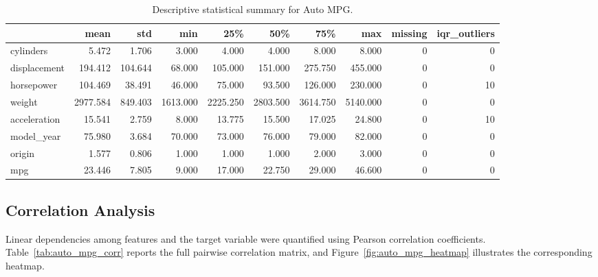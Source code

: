 \documentclass[11pt]{article}
\begin{document}
\begin{table}[H]
\centering
\small
\begin{tabular}{lrrrrrrrrr}
\toprule
 & mean & std & min & 25\% & 50\% & 75\% & max & missing & iqr\_outliers \\
\midrule
cylinders & 5.472 & 1.706 & 3.000 & 4.000 & 4.000 & 8.000 & 8.000 & 0 & 0 \\
displacement & 194.412 & 104.644 & 68.000 & 105.000 & 151.000 & 275.750 & 455.000 & 0 & 0 \\
horsepower & 104.469 & 38.491 & 46.000 & 75.000 & 93.500 & 126.000 & 230.000 & 0 & 10 \\
weight & 2977.584 & 849.403 & 1613.000 & 2225.250 & 2803.500 & 3614.750 & 5140.000 & 0 & 0 \\
acceleration & 15.541 & 2.759 & 8.000 & 13.775 & 15.500 & 17.025 & 24.800 & 0 & 10 \\
model\_year & 75.980 & 3.684 & 70.000 & 73.000 & 76.000 & 79.000 & 82.000 & 0 & 0 \\
origin & 1.577 & 0.806 & 1.000 & 1.000 & 1.000 & 2.000 & 3.000 & 0 & 0 \\
mpg & 23.446 & 7.805 & 9.000 & 17.000 & 22.750 & 29.000 & 46.600 & 0 & 0 \\
\bottomrule
\end{tabular}

\caption{Descriptive statistical summary for Auto MPG.}
\label{tab:auto_mpg_summary}
\end{table}

\subsection{Correlation Analysis}
Linear dependencies among features and the target variable were quantified using Pearson correlation coefficients. Table~\ref{tab:auto_mpg_corr} reports the full pairwise correlation matrix, and Figure~\ref{fig:auto_mpg_heatmap} illustrates the corresponding heatmap.
\end{document}
